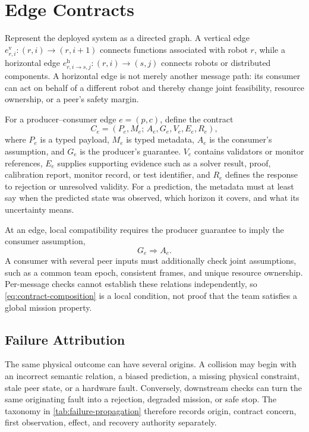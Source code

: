 \section{Edge Contracts}
\label{sec:edge-contracts}

Represent the deployed system as a directed graph.  A vertical edge
$e^{\mathrm v}_{r,i}:(r,i)\rightarrow(r,i+1)$ connects functions associated with
robot $r$, while a horizontal edge
$e^{\mathrm h}_{r,i\rightarrow s,j}:(r,i)\rightarrow(s,j)$ connects robots or
distributed components.  A horizontal edge is not merely another message path:
its consumer can act on behalf of a different robot and thereby change joint
feasibility, resource ownership, or a peer's safety margin.

For a producer--consumer edge $e=(p,c)$, define the contract
\begin{equation}
  C_e=(P_e,M_e;\,A_e,G_e,V_e,E_e,R_e),
  \label{eq:contract}
\end{equation}
where $P_e$ is a typed payload, $M_e$ is typed metadata, $A_e$ is the
consumer's assumption, and $G_e$ is the producer's guarantee.  $V_e$ contains
validators or monitor references, $E_e$ supplies supporting evidence such as a
solver result, proof, calibration report, monitor record, or test identifier,
and $R_e$ defines the response to rejection or unresolved validity.  For a
prediction, the metadata must at least say when the predicted state was
observed, which horizon it covers, and what its uncertainty means.

At an edge, local compatibility requires the producer guarantee to imply the
consumer assumption,
\begin{equation}
  G_e\Longrightarrow A_e.
  \label{eq:contract-composition}
\end{equation}
A consumer with several peer inputs must additionally check joint assumptions,
such as a common team epoch, consistent frames, and unique resource ownership.
Per-message checks cannot establish these relations independently, so
\eqref{eq:contract-composition} is a local condition, not proof that the team
satisfies a global mission property.

\subsection{Failure Attribution}

The same physical outcome can have several origins.  A collision may begin with
an incorrect semantic relation, a biased prediction, a missing physical
constraint, stale peer state, or a hardware fault.  Conversely, downstream
checks can turn the same originating fault into a rejection, degraded mission,
or safe stop.  The taxonomy in \cref{tab:failure-propagation} therefore records
origin, contract concern, first observation, effect, and recovery authority
separately.

\FloatBarrier


